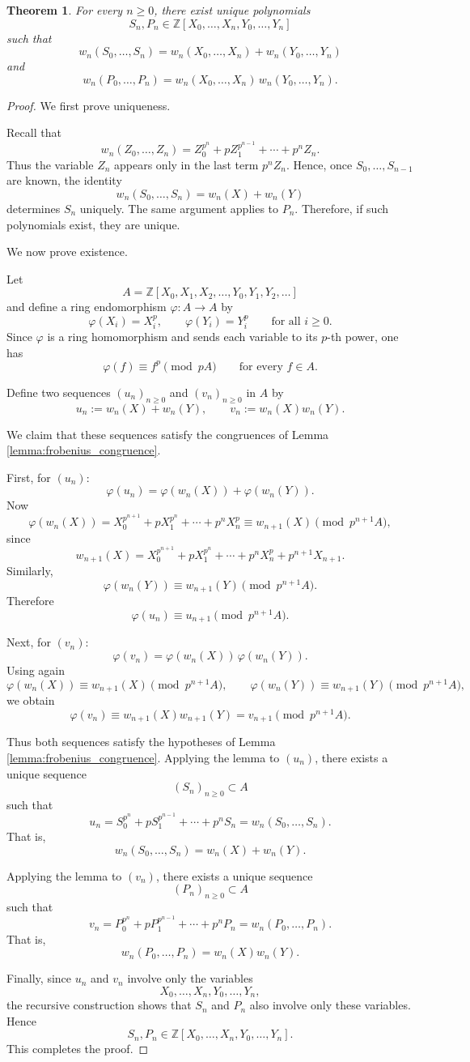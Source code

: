 \documentclass[oneside, a4paper, onecolumn, 11pt]{article}
\newtheorem{theorem}{Theorem}
\theoremstyle{definition}
\begin{document}
\begin{theorem}\label{thm:Witt_poly}
For every $n\geq 0$, there exist unique polynomials
\[S_n,P_n\in \mathbb{Z}[X_0,\dots,X_n,Y_0,\dots,Y_n]\]
such that
\[w_n(S_0,\dots,S_n)=w_n(X_0,\dots,X_n)+w_n(Y_0,\dots,Y_n)\]
and
\[w_n(P_0,\dots,P_n)=w_n(X_0,\dots,X_n)\,w_n(Y_0,\dots,Y_n).\]
\end{theorem}

\begin{proof}
We first prove uniqueness.

Recall that
\[w_n(Z_0,\dots,Z_n)=Z_0^{p^n}+pZ_1^{p^{n-1}}+\cdots+p^nZ_n.\]
Thus the variable $Z_n$ appears only in the last term $p^nZ_n$.
Hence, once $S_0,\dots,S_{n-1}$ are known, the identity
\[w_n(S_0,\dots,S_n)=w_n(X)+w_n(Y)\]
determines $S_n$ uniquely.
The same argument applies to $P_n$.
Therefore, if such polynomials exist, they are unique.

We now prove existence.

Let
\[A=\mathbb{Z}[X_0,X_1,X_2,\dots,Y_0,Y_1,Y_2,\dots]\]
and define a ring endomorphism $\varphi:A\to A$ by
\[\varphi(X_i)=X_i^p,\qquad \varphi(Y_i)=Y_i^p\qquad \text{for all } i\ge 0.\]
Since $\varphi$ is a ring homomorphism and sends each variable to its $p$-th power, one has
\[\varphi(f)\equiv f^p \pmod{pA}\qquad \text{for every } f\in A.\]

Define two sequences $(u_n)_{n\ge0}$ and $(v_n)_{n\ge0}$ in $A$ by
\[u_n:=w_n(X)+w_n(Y),\qquad v_n:=w_n(X)w_n(Y).\]

We claim that these sequences satisfy the congruences of Lemma \ref{lemma:frobenius_congruence}.

First, for $(u_n)$:
\[\varphi(u_n)=\varphi(w_n(X))+\varphi(w_n(Y)).\]
Now
\[\varphi(w_n(X))=X_0^{p^{n+1}}+pX_1^{p^n}+\cdots+p^nX_n^p\equiv w_{n+1}(X)\pmod{p^{n+1}A},\]
since
\[w_{n+1}(X)=X_0^{p^{n+1}}+pX_1^{p^n}+\cdots+p^nX_n^p+p^{n+1}X_{n+1}.\]
Similarly,
\[\varphi(w_n(Y))\equiv w_{n+1}(Y)\pmod{p^{n+1}A}.\]
Therefore
\[\varphi(u_n)\equiv u_{n+1}\pmod{p^{n+1}A}.\]

Next, for $(v_n)$:
\[\varphi(v_n)=\varphi(w_n(X))\,\varphi(w_n(Y)).\]
Using again
\[\varphi(w_n(X))\equiv w_{n+1}(X)\pmod{p^{n+1}A},\qquad\varphi(w_n(Y))\equiv w_{n+1}(Y)\pmod{p^{n+1}A},\]
we obtain
\[\varphi(v_n)\equiv w_{n+1}(X)w_{n+1}(Y)=v_{n+1}\pmod{p^{n+1}A}.\]

Thus both sequences satisfy the hypotheses of Lemma \ref{lemma:frobenius_congruence}. Applying the lemma to $(u_n)$, there exists a unique sequence
\[(S_n)_{n\ge0}\subset A\]
such that
\[u_n=S_0^{p^n}+pS_1^{p^{n-1}}+\cdots+p^nS_n=w_n(S_0,\dots,S_n).\]
That is,
\[w_n(S_0,\dots,S_n)=w_n(X)+w_n(Y).\]

Applying the lemma to $(v_n)$, there exists a unique sequence
\[(P_n)_{n\ge0}\subset A\]
such that
\[v_n=P_0^{p^n}+pP_1^{p^{n-1}}+\cdots+p^nP_n=w_n(P_0,\dots,P_n).\]
That is,
\[w_n(P_0,\dots,P_n)=w_n(X)w_n(Y).\]

Finally, since $u_n$ and $v_n$ involve only the variables
\[X_0,\dots,X_n,Y_0,\dots,Y_n,\]
the recursive construction shows that $S_n$ and $P_n$ also involve only these variables. Hence
\[S_n,P_n\in \mathbb{Z}[X_0,\dots,X_n,Y_0,\dots,Y_n].\]
This completes the proof.
\end{proof}
\end{document}

